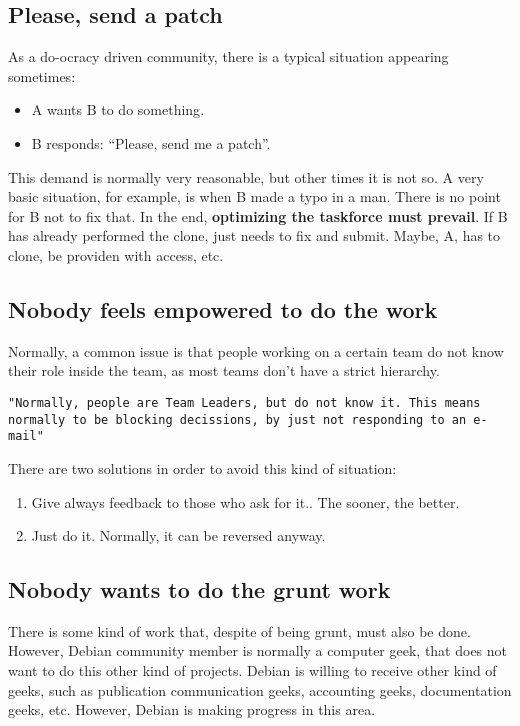 \documentclass[11pt]{article}
\begin{document}
\subsection{Please, send a patch}
As a do-ocracy driven community, there is a typical situation appearing sometimes:
\begin{itemize}
\item{A wants B to do something}.
\item{B responds: ``Please, send me a patch''}.
\end{itemize}
This demand is normally very reasonable, but other times it is not so. A very basic situation, for example, is when B made a typo in a man. There is no point for B not to fix that. In the end, \textbf{optimizing the taskforce must prevail}. If B has already performed the clone, just needs to fix and submit. Maybe, A, has to clone, be providen with access, etc. 

\subsection{Nobody feels empowered to do the work}
Normally, a common issue is that people working on a certain team do not know their role inside the team, as most teams don't have a strict hierarchy.
\begin{verbatim}
"Normally, people are Team Leaders, but do not know it. This means normally to be blocking decissions, by just not responding to an e-mail"
\end{verbatim}
There are two solutions in order to avoid this kind of situation:
\begin{enumerate}
\item{Give always feedback to those who ask for it.}. The sooner, the better.
\item{Just do it.} Normally, it can be reversed anyway.
\end{enumerate}

\subsection{Nobody wants to do the grunt work}
There is some kind of work that, despite of being grunt, must also be done. However, Debian community member is normally a computer geek, that does not want to do this other kind of projects. Debian is willing to receive other kind of geeks, such as publication communication geeks, accounting geeks, documentation geeks, etc. However, Debian is making progress in this area. 
\end{document}
